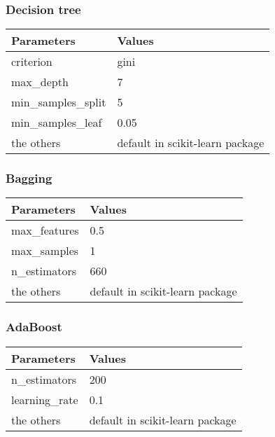 \documentclass[review]{elsarticle}
\begin{document}
\subsubsection{Decision tree}

\begin{table}[H]
    \begin{tabular}{|m{9em}|m{14em}|}
    \hline
    \textbf{Parameters} & \textbf{Values} \\ \hline
    criterion & gini \\ \hline
    max\_depth & 7 \\ \hline
    min\_samples\_split & 5 \\ \hline
    min\_samples\_leaf & 0.05 \\ \hline
    the others & default in scikit-learn package \\ \hline
    \end{tabular}
\end{table}

\subsubsection{Bagging}

\begin{table}[H]
    \begin{tabular}{|m{9em}|m{14em}|}
    \hline
    \textbf{Parameters} & \textbf{Values} \\ \hline
    max\_features & 0.5 \\ \hline
    max\_samples & 1 \\ \hline
    n\_estimators & 660 \\ \hline
    the others & default in scikit-learn package \\ \hline
    \end{tabular}
\end{table}

\subsubsection{AdaBoost}

\begin{table}[H]
    \begin{tabular}{|m{9em}|m{14em}|}
    \hline
    \textbf{Parameters} & \textbf{Values} \\ \hline
    n\_estimators & 200 \\ \hline
    learning\_rate & 0.1 \\ \hline
    the others & default in scikit-learn package \\ \hline
    \end{tabular}
\end{table}
\end{document}
